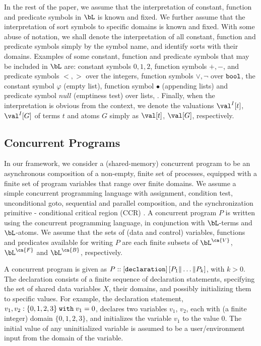 In the rest of the paper, we assume that the interpretation of
constant, function and predicate symbols in $\bL$ is known and fixed.
We further assume that the interpretation of sort symbols to specific
domains is known and fixed. With some abuse of notation, we shall
denote the interpretation of all constant, function and predicate
symbols simply by the symbol name, and identify sorts with their
domains. Examples of some constant, function and predicate symbols
that may be included in $\bL$ are: constant symbols $0, 1, 2$, function
symbols $+,-$, and predicate symbols $<,>$ over the integers, function
symbols $\vee, \neg$ over ${\tt bool}$, the constant symbol $\varphi$
(empty list), function symbol $\bullet$ (appending lists) and
predicate symbol $null$ (emptiness test) over lists, \etc. Finally,
when the interpretation is obvious from the context, we denote the
valuations $\val^I[t]$, $\val^I[G]$ of terms $t$ and atoms $G$ simply as
$\val[t]$, $\val[G]$, respectively.  





\subsection{Concurrent Programs}\label{sec:prog}

In our framework, we consider a (shared-memory) concurrent program to
be an asynchronous composition of a non-empty, finite set of
processes, equipped with a finite set of program variables that range
over finite domains. We assume a simple concurrent programming
language with assignment, condition test, unconditional goto,
sequential and parallel composition, and the synchronization primitive
- conditional critical region (CCR) \cite{Hoare71,Hansen81}. A concurrent
program $P$ is written using the concurrent programming language, in
conjunction with $\bL$-terms and $\bL$-atoms. We assume that the sets
of (data and control) variables, functions and predicates available
for writing $P$ are each finite subsets of $\bL^{\ca{V}}$,
$\bL^{\ca{F}}$ and $\bL^{\ca{B}}$, respectively. 



A concurrent program is given as $P:: [{\tt declaration}] \, [P_1 {\tt
\parallel} \ldots {\tt \parallel} P_k]$, with $k > 0$. The declaration
consists of a finite sequence of declaration statements, specifying
the set of shared data variables $X$, their domains, and possibly
initializing them to specific values. For example, the declaration
statement, $v_1,v_2:\{0,1,2,3\} \; {\tt with} \; v_1 = 0$, declares two
variables $v_1$, $v_2$, each with (a finite integer) domain
$\{0,1,2,3\}$, and initializes the variable $v_1$ to the value $0$.
The initial value of any uninitialized variable is assumed to be a
user/environment input from the domain of the variable. 

